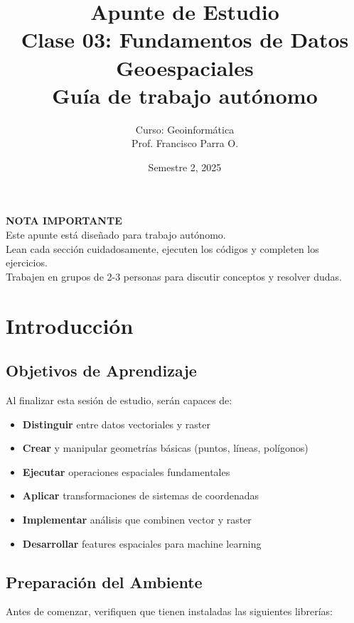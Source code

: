 \documentclass[11pt,a4paper]{article}
\title{{\Huge \textbf{Apunte de Estudio}}\\[0.5cm]
{\Large Clase 03: Fundamentos de Datos Geoespaciales}\\[0.3cm]
{\large Guía de trabajo autónomo}}
\author{Curso: Geoinformática\\
Prof. Francisco Parra O.}
\date{Semestre 2, 2025}
\begin{document}
\maketitle
\thispagestyle{empty}

\begin{tcolorbox}[colframe=usachred,colback=red!5]
\centering
\textbf{NOTA IMPORTANTE}\\[0.3cm]
Este apunte está diseñado para trabajo autónomo.\\
Lean cada sección cuidadosamente, ejecuten los códigos y completen los ejercicios.\\
Trabajen en grupos de 2-3 personas para discutir conceptos y resolver dudas.
\end{tcolorbox}

\newpage

\tableofcontents
\newpage

\section{Introducción}

\subsection{Objetivos de Aprendizaje}

Al finalizar esta sesión de estudio, serán capaces de:

\begin{itemize}[leftmargin=*]
    \item \textbf{Distinguir} entre datos vectoriales y raster
    \item \textbf{Crear} y manipular geometrías básicas (puntos, líneas, polígonos)
    \item \textbf{Ejecutar} operaciones espaciales fundamentales
    \item \textbf{Aplicar} transformaciones de sistemas de coordenadas
    \item \textbf{Implementar} análisis que combinen vector y raster
    \item \textbf{Desarrollar} features espaciales para machine learning
\end{itemize}

\subsection{Preparación del Ambiente}

Antes de comenzar, verifiquen que tienen instaladas las siguientes librerías:
\end{document}
